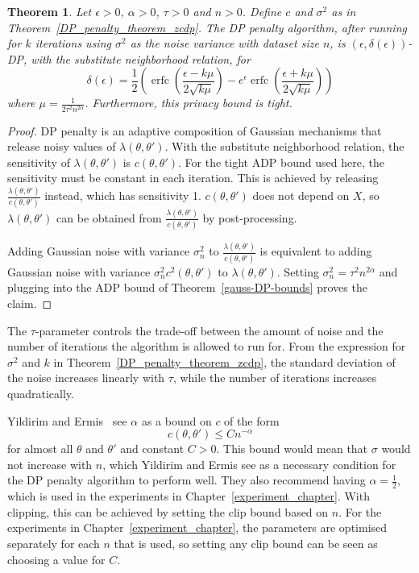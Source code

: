 \documentclass[english,twoside,openright]{HYgraduMLDS}
\newtheorem{theorem}{Theorem}
\DeclareMathOperator{\erfc}{erfc}
\begin{document}
\begin{theorem}\label{DP_penalty_theorem_adp}
    Let \(\epsilon > 0\), \(\alpha > 0\), \(\tau > 0\) and \(n > 0\).
    Define \(c\) and \(\sigma^{2}\) as in Theorem~\ref{DP_penalty_theorem_zcdp}.
    The DP penalty algorithm, after running for \(k\) iterations using \(\sigma^{2}\)
    as the noise variance with dataset size \(n\),
    is \((\epsilon, \delta(\epsilon))\)-DP, with the substitute neighborhood
    relation, for
    \[
        \delta(\epsilon) 
        = \frac{1}{2}\left(
            \erfc\left(\frac{\epsilon - k\mu}{2\sqrt{k\mu}}\right)
            - e^\epsilon \erfc\left(\frac{\epsilon + k\mu}{2\sqrt{k\mu}}\right)
        \right)
    \]
    where \(\mu = \frac{1}{2\tau^2 n^{2\alpha}}\). Furthermore, this privacy
    bound is tight.
\end{theorem}
\begin{proof}
    DP penalty is an adaptive composition of Gaussian mechanisms that release 
    noisy values of \(\lambda(\theta, \theta')\). With the substitute neighborhood
    relation, the sensitivity of \(\lambda(\theta, \theta')\) is
    \(c(\theta, \theta')\). For the tight ADP bound used here, the sensitivity must be 
    constant in each iteration. This is achieved by releasing 
    \(\frac{\lambda(\theta, \theta')}{c(\theta, \theta')}\) instead, which 
    has sensitivity 1. \(c(\theta, \theta')\) does not depend on \(X\), 
    so \(\lambda(\theta, \theta')\) can be obtained from 
    \(\frac{\lambda(\theta, \theta')}{c(\theta, \theta')}\) by post-processing.

    Adding Gaussian noise with variance \(\sigma_n^2\) to 
    \(\frac{\lambda(\theta, \theta')}{c(\theta, \theta')}\)
    is equivalent to adding Gaussian noise with variance 
    \(\sigma_n^2 c^2(\theta, \theta')\) to \(\lambda(\theta, \theta')\).
    Setting \(\sigma_n^2 = \tau^2n^{2\alpha}\) and plugging into 
    the ADP bound of Theorem~\ref{gauss-DP-bounds} proves the 
    claim.
\end{proof}

The \(\tau\)-parameter controls the trade-off between the amount of noise
and the number of iterations the algorithm is allowed to run for. From the
expression for \(\sigma^{2}\) and \(k\) in Theorem~\ref{DP_penalty_theorem_zcdp},
the standard deviation of the noise increases linearly with \(\tau\), while
the number of iterations increases quadratically.

Yildirim and Ermis~\cite{YildirimE19} see \(\alpha\) as a bound on \(c\) of the
form
\[
  c(\theta, \theta') \leq Cn^{-\alpha}
\]
for almost all \(\theta\) and \(\theta'\) and constant \(C > 0\).
This bound would mean that \(\sigma\)
would not increase with \(n\), which Yildirim and Ermis see as a necessary
condition for the DP penalty algorithm to perform well. They also recommend
having \(\alpha = \frac{1}{2}\), which is used in the experiments in
Chapter~\ref{experiment_chapter}.
With clipping, this can be achieved by setting the clip bound based on \(n\).
For the experiments
in Chapter~\ref{experiment_chapter}, the parameters are optimised separately
for each \(n\) that is used, so setting any clip bound can be seen as
choosing a value for \(C\).
\end{document}
